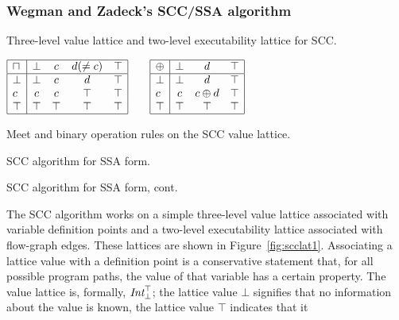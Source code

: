 \documentclass[12pt,titlepage,twoside]{article}
\newcommand{\figscale}{1.0}
\newcommand{\meet}{\ensuremath{\sqcap}}
\begin{document}
\subsubsection{Wegman and Zadeck's SCC/SSA algorithm}
\begin{myfigure}
\centering\renewcommand{\figscale}{0.5}
\caption[Value and executability lattices for SCC.]
{Three-level value lattice and two-level executability lattice for SCC.}
\label{fig:scclat1}
\end{myfigure}
\begin{mytable}\centering
$\begin{array}{|l|cccc|} \hline
\meet & \bot & c & d (\not= c) & \top \\ \hline
\bot  & \bot & c & d  & \top \\
c     &   c  & c &\top & \top \\
\top  & \top &\top&\top& \top \\ \hline
\end{array}%
\quad\quad%
\begin{array}{|l|ccc|}\hline
\oplus& \bot &   d  & \top \\ \hline
\bot  & \bot &   d  & \top \\
c     &   c  &c\oplus d& \top \\
\top  & \top & \top & \top \\ \hline
\end{array}$
\caption{Meet and binary operation rules on the SCC value lattice.}
\label{tab:sccmeet1}
\end{mytable}
\begin{myalgorithm}\small

\caption{SCC algorithm for SSA form.}\label{alg:scc}
\end{myalgorithm}
\begin{myalgorithm}\small

\caption{SCC algorithm for SSA form, cont.}\label{alg:scc2}
\end{myalgorithm}
The SCC algorithm works on a simple three-level value lattice
associated with variable definition points and a two-level
executability lattice associated with flow-graph edges.  These
lattices are shown in Figure~\vref{fig:scclat1}.  Associating a lattice
value with a definition point is a conservative statement that, for
all possible program paths, the value of that variable has a certain
property.  The value lattice is, formally, ${\mbox{\em Int}}_\bot^\top$;
the lattice value $\bot$ signifies that no information
about the value is known, the lattice value $\top$ indicates that it
\end{document}
